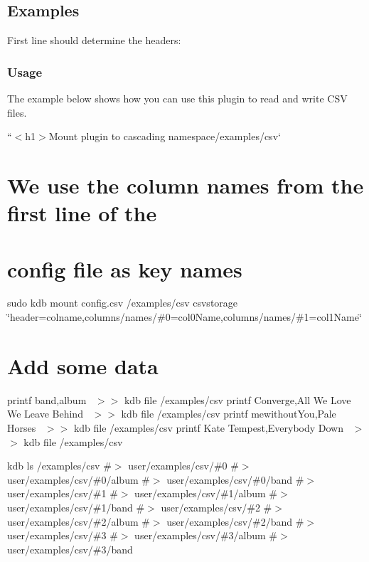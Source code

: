 \subsection*{Examples}

First line should determine the headers\+: 


\subsubsection*{Usage}

The example below shows how you can use this plugin to read and write C\+SV files.

``{\ttfamily  $<$h1$>$Mount plugin to cascading namespace}/examples/csv` \section*{We use the column names from the first line of the}

\section*{config file as key names}

sudo kdb mount config.\+csv /examples/csv csvstorage \char`\"{}header=colname,columns/names/\#0=col0\+Name,columns/names/\#1=col1\+Name\char`\"{}

\section*{Add some data}

printf \textquotesingle{}band,album~\newline
\textquotesingle{} $>$$>$ {\ttfamily kdb file /examples/csv} printf \textquotesingle{}Converge,All We Love We Leave Behind~\newline
\textquotesingle{} $>$$>$ {\ttfamily kdb file /examples/csv} printf \textquotesingle{}mewithout\+You,Pale Horses~\newline
\textquotesingle{} $>$$>$ {\ttfamily kdb file /examples/csv} printf \textquotesingle{}Kate Tempest,Everybody Down~\newline
\textquotesingle{} $>$$>$ {\ttfamily kdb file /examples/csv}

kdb ls /examples/csv \#$>$ user/examples/csv/\#0 \#$>$ user/examples/csv/\#0/album \#$>$ user/examples/csv/\#0/band \#$>$ user/examples/csv/\#1 \#$>$ user/examples/csv/\#1/album \#$>$ user/examples/csv/\#1/band \#$>$ user/examples/csv/\#2 \#$>$ user/examples/csv/\#2/album \#$>$ user/examples/csv/\#2/band \#$>$ user/examples/csv/\#3 \#$>$ user/examples/csv/\#3/album \#$>$ user/examples/csv/\#3/band

